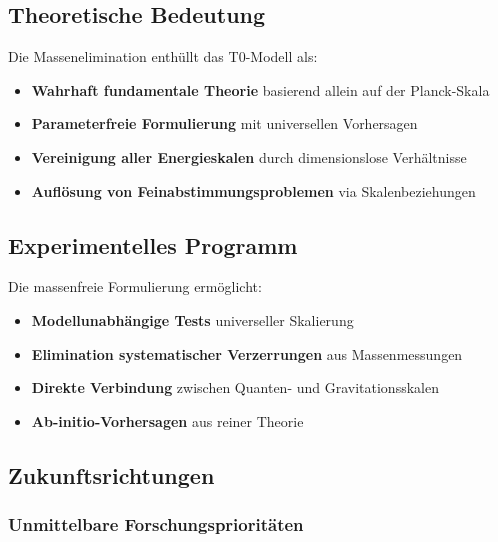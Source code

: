 \documentclass[12pt,a4paper]{article}
\begin{document}
	\subsection{Theoretische Bedeutung}
	\label{subsec:theoretical_significance}
	
	Die Massenelimination enthüllt das T0-Modell als:
	
	\begin{tcolorbox}[colback=green!5!white,colframe=green!75!black,title=T0-Modell: Wahre Natur]
		\begin{itemize}
			\item \textbf{Wahrhaft fundamentale Theorie} basierend allein auf der Planck-Skala
			\item \textbf{Parameterfreie Formulierung} mit universellen Vorhersagen
			\item \textbf{Vereinigung aller Energieskalen} durch dimensionslose Verhältnisse
			\item \textbf{Auflösung von Feinabstimmungsproblemen} via Skalenbeziehungen
		\end{itemize}
	\end{tcolorbox}
	
	\subsection{Experimentelles Programm}
	\label{subsec:experimental_program}
	
	Die massenfreie Formulierung ermöglicht:
	
	\begin{itemize}
		\item \textbf{Modellunabhängige Tests} universeller Skalierung
		\item \textbf{Elimination systematischer Verzerrungen} aus Massenmessungen
		\item \textbf{Direkte Verbindung} zwischen Quanten- und Gravitationsskalen
		\item \textbf{Ab-initio-Vorhersagen} aus reiner Theorie
	\end{itemize}
	
	\subsection{Zukunftsrichtungen}
	\label{subsec:future_directions}
	
	\subsubsection{Unmittelbare Forschungsprioritäten}
	
\end{document}
